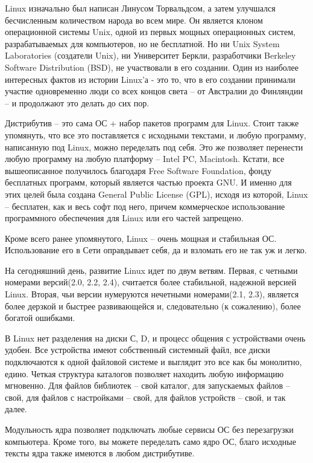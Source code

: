 Linux изначально был написан Линусом Торвальдсом, а затем улучшался бесчисленным количеством народа во всем мире. Он является клоном операционной системы Unix, одной из первых мощных операционных систем, разрабатываемых для компьютеров, но не бесплатной. Но ни Unix System Laboratories (создатели Unix), ни Университет Беркли, разработчики Berkeley Software Distribution (BSD), не участвовали в его создании. Один из наиболее интересных фактов из истории Linux'а - это то, что в его создании принимали участие одновременно люди со всех концов света – от Австралии до Финляндии – и продолжают это делать до сих пор.

Дистрибутив – это сама ОС + набор пакетов программ для Linux. Стоит также упомянуть, что все это поставляется с исходными текстами, и любую программу, написанную под Linux, можно переделать под себя. Это же позволяет перенести любую программу на любую платформу – Intel PC, Macintosh. Кстати, все вышеописанное получилось благодаря Free Software Foundation, фонду бесплатных программ, который является частью проекта GNU. И именно для этих целей была создана General Public License (GPL), исходя из которой, Linux – бесплатен, как и весь софт под него, причем коммерческое использование программного обеспечения для Linux или его частей запрещено.

Кроме всего ранее упомянутого, Linux – очень мощная и стабильная ОС. Использование его в Сети оправдывает себя, да и взломать его не так уж и легко.

На сегодняшний день, развитие Linux идет по двум ветвям. Первая, с четными номерами версий(2.0, 2.2, 2.4), считается более стабильной, надежной версией Linux. Вторая, чьи версии нумеруются нечетными номерами(2.1, 2.3), является более дерзкой и быстрее развивающейся и, следовательно (к сожалению), более богатой ошибками.

В Linux нет разделения на диски С, D, и процесс общения с устройствами очень удобен. Все устройства имеют собственный системный файл, все диски подключаются к одной файловой системе и выглядит это все как бы монолитно, едино. Четкая структура каталогов позволяет находить любую информацию мгновенно. Для файлов библиотек – свой каталог, для запускаемых файлов – свой, для файлов с настройками – свой, для файлов устройств – свой, и так далее.

Модульность ядра позволяет подключать любые сервисы ОС без перезагрузки компьютера. Кроме того, вы можете переделать само ядро ОС, благо исходные тексты ядра также имеются в любом дистрибутиве.

